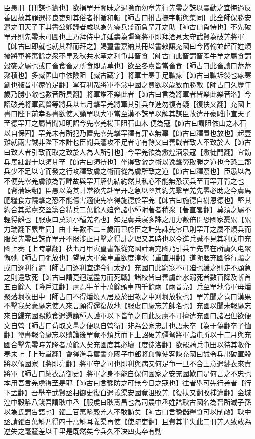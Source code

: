臣愚冊【冊謀也籌也】欲捐䍐开闇昧之過隐而勿章先行先零之誅以震動之宜悔過反善因赦其罪選擇良吏知其俗者拊循和輯【師古曰拊古撫字輯與集同】此全師保勝安邉之冊天子下其書公卿議者咸以為先零兵盛而負䍐开之助【師古曰負恃也】不先破䍐开則先零未可圖也上乃拜侍中許延壽為彊弩將軍即拜酒泉太守武賢為破羌將軍【師古曰即就也就其郡而拜之】賜璽書嘉納其冊以書敕讓充國曰今轉輸並起百姓煩擾將軍將萬餘之衆不早及秋共水草之利争其畜食【師古曰此畜謂畜產牛羊之屬食謂穀麥之屬也或曰畜食畜之所食即謂草也】欲至冬虜皆當畜食【師古曰此畜讀曰蓄蓄聚積也】多臧匿山中依險阻【臧古藏字】將軍士寒手足皸瘃【師古曰皸坼裂也瘃寒創也皸音軍瘃竹足翻】寧有利哉將軍不念中國之費欲以歲數而勝敵【師古曰久歷年歲乃勝小敵也數音所具翻】將軍誰不樂此者【師古曰言為將軍者皆樂此樂音洛】今詔破羌將軍武賢等將兵以七月擊䍐羌將軍其引兵並進勿復有疑【復扶又翻】充國上書曰陛下前幸賜書欲使人諭䍐以大軍當至漢不誅䍐以解其謀臣故遣开豪雕庫宣天子至德䍐开之屬皆聞知明詔今先零羌楊玉阻石山木便為寇【師古曰謂阻依山之木石以自保固】䍐羌未有所犯乃置先零先擊䍐釋有罪誅無辜【師古曰釋置也放也】起壹難就兩害誠非陛下本計也臣聞兵灋攻不足者守有餘又曰善戰者致人不致於人【師古曰致人者引致而取之致於人為人所引也】今䍐羌欲為燉煌酒泉寇【燉徒門翻】宜飭兵馬練戰士以須其至【師古曰須待也】坐得致敵之術以逸擊勞取勝之道也今恐二郡兵少不足以守而發之行攻釋致虜之術而從為虜所致之道【師古曰釋廢也】臣愚以為不便先零羌虜欲為背畔故與䍐开解仇結約然其私心不能無恐漢兵至而䍐开背之也【背蒲妹翻】臣愚以為其計常欲先赴䍐开之急以堅其約先擊䍐羌先零必助之今虜馬肥糧食方饒擊之恐不能傷害適使先零得施德於䍐羌【師古曰施德自樹恩德也】堅其約合其黨虜交堅黨合精兵二萬餘人廹脅諸小種附著者稍衆【著直畧翻】莫須之屬不輕得離也【服䖍曰莫須小種羌名也】如是虜兵寖多誅之用力數倍臣恐國家憂累【累力瑞翻下累重同】由十年數不二三歲而已於臣之計先誅先零已則䍐开之屬不煩兵而服矣先零已誅而䍐开不服涉正月擊之得計之理又其時也以今進兵誠不見其利戊申充國上奏【上時掌翻】秋七月甲寅璽書報從充國計焉充國乃引兵至先零在所虜久屯聚懈弛【師古曰弛放也】望見大軍棄車重欲度湟水【重直用翻】道阨陿充國徐行驅之或曰逐利行遲【師古曰逐利宜速今行太遅】充國曰此窮寇不可廹也緩之則走不顧急之則還致死【師古曰謂更迴還盡力而死戰】諸校皆曰善虜赴水溺死者數百降及斬首五百餘人【降戶江翻】虜焉牛羊十萬餘頭車四千餘兩【兩音亮】兵至䍐地令軍毋燔聚落芻牧田中【師古曰不得燔燒人居及於田畝之中刈芻放牧也】䍐羌聞之喜曰漢果不擊我矣豪靡忘使人來言願得還復故地【服䖍曰靡忘羌帥名也】充國以聞未報靡忘來自歸充國賜飲食遣還諭種人護軍以下皆争之曰此反虜不可擅遣充國曰諸君但欲便文自營【師古曰苟取文墨之便以自營衛】非為公家忠計也語未卒【為于偽翻卒子恤翻】璽書報令靡忘以贖論後䍐竟不煩兵而下上詔破羌彊弩將軍詣屯所以十二月與充國合擊先零時羌降者萬餘人矣充國度其必壞【度徒洛翻】欲罷騎兵屯田以待其敝作奏未上【上時掌翻】會得進兵璽書充國子中郎將卬懼使客諫充國曰誠令兵出破軍殺將以傾國家【將即亮翻】將軍守之可也即利與病又何足争一旦不合上意遣繡衣來責將軍【師古曰繡衣謂御史】將軍之身不能自保何國家之安充國歎曰是何言之不忠也本用吾言羌虜得至是耶【師古曰言豫防之可無今日之寇也】往者舉可先行羌者【行下孟翻】吾舉辛武賢丞相御史復白遣義渠安國竟沮敗羌【復扶又翻敗補邁翻】金城湟中穀斛八錢吾謂耿中丞【服䖍曰耿夀昌也為司農中丞姓譜耿古國名為晉所滅子孫以為氏謂告語也】糴三百萬斛穀羌人不敢動矣【師古曰言豫儲糧食可以制敵】耿中丞請糴百萬斛乃得四十萬斛耳義渠再使【使疏吏翻】且費其半失此二冊羌人致敢為逆失之毫釐差以千里是既然矣今兵久不决四夷卒有動
